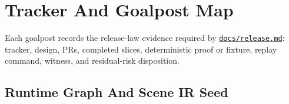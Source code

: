 \section{Tracker And Goalpost Map}\label{record-260-tracker-and-goalpost-map}

Each goalpost records the release-law evidence required by \href{https://github.com/flyingrobots/bijou/blob/cbd70612140e7a450d764b3c7be1c6af878b99bc/docs/release.md}{\texttt{d\allowbreak{}o\allowbreak{}c\allowbreak{}s\allowbreak{}/\allowbreak{}r\allowbreak{}e\allowbreak{}l\allowbreak{}e\allowbreak{}a\allowbreak{}s\allowbreak{}e\allowbreak{}.\allowbreak{}m\allowbreak{}d}}: tracker, design, PRs, completed slices, deterministic proof or fixture, replay command, witness, and residual-risk disposition.

\subsection{Runtime Graph And Scene IR Seed}\label{record-260-runtime-graph-and-scene-ir-seed}

